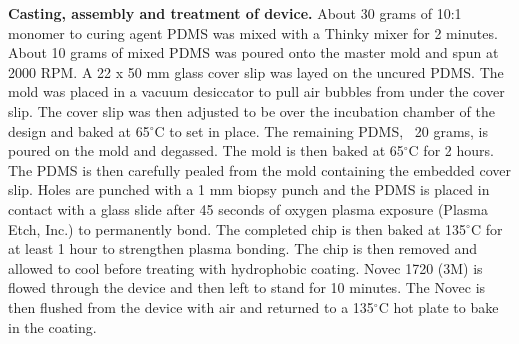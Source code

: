 \textbf{Casting, assembly and treatment of device.} About 30 grams of 10:1 monomer to curing agent PDMS was mixed with a Thinky mixer for 2 minutes.
About 10 grams of mixed PDMS was poured onto the master mold and spun at 2000 RPM.
A 22 x 50 mm glass cover slip was layed on the uncured PDMS.
The mold was placed in a vacuum desiccator to pull air bubbles from under the cover slip.
The cover slip was then adjusted to be over the incubation chamber of the design and baked at 65$^{\circ}$C to set in place.
The remaining PDMS, ~20 grams, is poured on the mold and degassed.
The mold is then baked at 65$^{\circ}$C for 2 hours.
The PDMS is then carefully pealed from the mold containing the embedded cover slip.
Holes are punched with a 1 mm biopsy punch and the PDMS is placed in contact with a glass slide after 45 seconds of oxygen plasma exposure (Plasma Etch, Inc.) to permanently bond.
The completed chip is then baked at 135$^{\circ}$C for at least 1 hour to strengthen plasma bonding.
The chip is then removed and allowed to cool before treating with hydrophobic coating.
Novec 1720 (3M) is flowed through the device and then left to stand for 10 minutes.
The Novec is then flushed from the device with air and returned to a 135$^{\circ}$C hot plate to bake in the coating.
